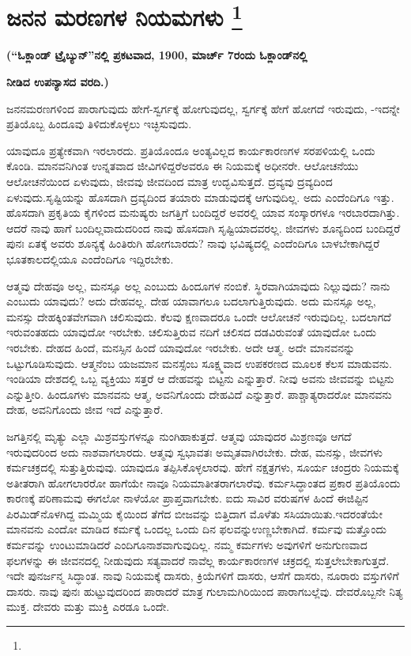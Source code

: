 
\chapter[ಜನನ ಮರಣಗಳ ನಿಯಮಗಳು ]{ಜನನ ಮರಣಗಳ ನಿಯಮಗಳು \protect\footnote{}}

\centerline{\textbf{(“ಓಕ್ಲಾಂಡ್​ ಟ್ರೈಬ್ಯುನ್​”ನಲ್ಲಿ ಪ್ರಕಟವಾದ, 1900, ಮಾರ್ಚ್​ 7ರಂದು ಓಕ್ಲಾಂಡ್​ನಲ್ಲಿ}}

\centerline{\textbf{ನೀಡಿದ ಉಪನ್ಯಾಸದ ವರದಿ.)}}

ಜನನಮರಣಗಳಿಂದ ಪಾರಾಗುವುದು ಹೇಗೆ-ಸ್ವರ್ಗಕ್ಕೆ ಹೋಗುವುದಲ್ಲ, ಸ್ವರ್ಗಕ್ಕೆ ಹೇಗೆ ಹೋಗದೆ ಇರುವುದು, -ಇದನ್ನೇ ಪ್ರತಿಯೊಬ್ಬ ಹಿಂದೂವು ತಿಳಿದುಕೊಳ್ಳಲು ಇಚ್ಛಿಸುವುದು.

ಯಾವುದೂ ಪ್ರತ್ಯೇಕವಾಗಿ ಇರಲಾರದು. ಪ್ರತಿಯೊಂದೂ ಅಂತ್ಯವಿಲ್ಲದ ಕಾರ್ಯಕಾರಣಗಳ ಸರಪಳಿಯಲ್ಲಿ ಒಂದು ಕೊಂಡಿ. ಮಾನವನಿಗಿಂತ ಉನ್ನತವಾದ ಜೀವಿಗಳಿದ್ದರೆ\break ಅವರೂ ಈ ನಿಯಮಕ್ಕೆ ಅಧೀನರೇ. ಆಲೋಚನೆಯು ಆಲೋಚನೆಯಿಂದ ಏಳುವುದು, ಜೀವವು ಜೀವದಿಂದ ಮಾತ್ರ ಉದ್ಭವಿಸುತ್ತದೆ. ದ್ರವ್ಯವು ದ್ರವ್ಯದಿಂದ ಏಳುವುದು.\break ಸೃಷ್ಟಿಯನ್ನು ಹೊಸದಾಗಿ ದ್ರವ್ಯದಿಂದ ತಯಾರು ಮಾಡುವುದಕ್ಕೆ ಆಗುವುದಿಲ್ಲ. ಅದು ಎಂದೆಂದಿಗೂ ಇತ್ತು. ಹೊಸದಾಗಿ ಪ್ರಕೃತಿಯ ಕೈಗಳಿಂದ ಮನುಷ್ಯರು ಜಗತ್ತಿಗೆ ಬಂದಿದ್ದರೆ ಅವರಲ್ಲಿ ಯಾವ ಸಂಸ್ಕಾರಗಳೂ ಇರಬಾರದಾಗಿತ್ತು. ಆದರೆ ನಾವು ಹಾಗೆ ಬಂದಿಲ್ಲವಾದುದರಿಂದ ನಾವು ಹೊಸದಾಗಿ ಸೃಷ್ಟಿಯಾದವರಲ್ಲ. ಜೀವಗಳು ಶೂನ್ಯದಿಂದ ಬಂದಿದ್ದರೆ ಪುನಃ ಏತಕ್ಕೆ ಅವರು ಶೂನ್ಯಕ್ಕೆ ಹಿಂತಿರುಗಿ ಹೋಗಬಾರದು? ನಾವು ಭವಿಷ್ಯದಲ್ಲಿ ಎಂದೆಂದಿಗೂ ಬಾಳಬೇಕಾಗಿದ್ದರೆ ಭೂತಕಾಲದಲ್ಲಿಯೂ ಎಂದೆಂದಿಗೂ ಇದ್ದಿರಬೇಕು.

ಆತ್ಮವು ದೇಹವೂ ಅಲ್ಲ, ಮನಸ್ಸೂ ಅಲ್ಲ ಎಂಬುದು ಹಿಂದೂಗಳ ನಂಬಿಕೆ. ಸ್ಥಿರವಾಗಿ\break ಯಾವುದು ನಿಲ್ಲುವುದು? ನಾನು ಎಂಬುದು ಯಾವುದು? ಅದು ದೇಹವಲ್ಲ. ದೇಹ ಯಾವಾಗಲೂ ಬದಲಾಗುತ್ತಿರುವುದು. ಅದು ಮನಸ್ಸೂ ಅಲ್ಲ, ಮನಸ್ಸು ದೇಹಕ್ಕಿಂತ\break ವೇಗವಾಗಿ ಚಲಿಸುವುದು. ಕೆಲವು ಕ್ಷಣವಾದರೂ ಒಂದೇ ಆಲೋಚನೆ ಇರುವುದಿಲ್ಲ. ಬದಲಾಗದೆ ಇರುವಂತಹದು ಯಾವುದೋ ಇರಬೇಕು. ಚಲಿಸುತ್ತಿರುವ ನದಿಗೆ ಚಲಿಸದ ದಡವಿರುವಂತೆ ಯಾವುದೋ ಒಂದು ಇರಬೇಕು. ದೇಹದ ಹಿಂದೆ, ಮನಸ್ಸಿನ ಹಿಂದೆ ಯಾವುದೋ ಇರಬೇಕು. ಅದೇ ಆತ್ಮ. ಅದೇ ಮಾನವನನ್ನು ಒಟ್ಟುಗೂಡಿಸುವುದು. ಆತ್ಮನೆಂಬ ಯಜಮಾನ ಮನಸ್ಸೆಂಬ ಸೂಕ್ಷ್ಮವಾದ ಉಪಕರಣದ ಮೂಲಕ ಕೆಲಸ ಮಾಡುವನು. ಇಂಡಿಯಾ ದೇಶದಲ್ಲಿ ಒಬ್ಬ ವ್ಯಕ್ತಿಯು ಸತ್ತರೆ ಆ ದೇಹವನ್ನು ಬಿಟ್ಟನು ಎನ್ನುತ್ತಾರೆ. ನೀವು ಅವನು ಜೀವವನ್ನು ಬಿಟ್ಟನು ಎನ್ನುತ್ತೀರಿ. ಹಿಂದೂಗಳು ಮಾನವನು ಆತ್ಮ, ಅವನಿಗೊಂದು ದೇಹವಿದೆ ಎನ್ನುತ್ತಾರೆ. ಪಾಶ್ಚಾತ್ಯರಾದರೋ ಮಾನವನು ದೇಹ, ಅವನಿಗೊಂದು ಜೀವ ಇದೆ ಎನ್ನುತ್ತಾರೆ.

ಜಗತ್ತಿನಲ್ಲಿ ಮೃತ್ಯು ಎಲ್ಲಾ ಮಿಶ್ರವಸ್ತುಗಳನ್ನೂ ನುಂಗಿಹಾಕುತ್ತದೆ. ಆತ್ಮವು ಯಾವುದರ ಮಿಶ್ರಣವೂ ಆಗದೆ ಇರುವುದರಿಂದ ಅದು ನಾಶವಾಗಲಾರದು. ಆತ್ಮವು ಸ್ವಭಾವತಃ ಅಮೃತವಾಗಿರಬೇಕು. ದೇಹ, ಮನಸ್ಸು, ಜೀವಗಳು ಕರ್ಮಚಕ್ರದಲ್ಲಿ ಸುತ್ತುತ್ತಿರುವುವು. ಯಾವುದೂ ತಪ್ಪಿಸಿಕೊಳ್ಳಲಾರವು. ಹೇಗೆ ನಕ್ಷತ್ರಗಳು, ಸೂರ್ಯ ಚಂದ್ರರು ನಿಯಮಕ್ಕೆ ಅತೀತರಾಗಿ ಹೋಗಲಾರರೋ ಹಾಗೆಯೇ ನಾವೂ ನಿಯಮಾತೀತರಾಗಲಾರೆವು. ಕರ್ಮಸಿದ್ಧಾಂತದ ಪ್ರಕಾರ ಪ್ರತಿಯೊಂದು ಕಾರಣಕ್ಕೆ ಪರಿಣಾಮವು ಈಗಲೋ ನಾಳೆಯೋ ಪ್ರಾಪ್ತವಾಗಬೇಕು. ಐದು ಸಾವಿರ ವರುಷಗಳ ಹಿಂದೆ ಈಜಿಪ್ಟಿನ ಪಿರಮಿಡ್​ನೊಳಗಿದ್ದ ಮಮ್ಮಿಯ ಕೈಯಿಂದ ತೆಗೆದ ಬೀಜವನ್ನು ಬಿತ್ತಿದಾಗ ಮೊಳೆತು ಸಸಿಯಾಯಿತು.\break ಇದರಂತೆಯೇ ಮಾನವನು ಎಂದೋ ಮಾಡಿದ ಕರ್ಮಕ್ಕೆ ಒಂದಲ್ಲ ಒಂದು ದಿನ ಫಲವನ್ನು\break ಉಣ್ಣಬೇಕಾಗಿದೆ. ಕರ್ಮವು ಮತ್ತೊಂದು ಕರ್ಮವನ್ನು ಉಂಟುಮಾಡಿದರೆ ಎಂದಿಗೂ\break ನಾಶವಾಗುವುದಿಲ್ಲ. ನಮ್ಮ ಕರ್ಮಗಳು ಅವುಗಳಿಗೆ ಅನುಗುಣವಾದ ಫಲಗಳನ್ನು ಈ ಜೀವನದಲ್ಲಿ ನೀಡುವುದು ಸತ್ಯವಾದರೆ ನಾವೆಲ್ಲ ಕಾರ್ಯಕಾರಣಗಳ ಚಕ್ರದಲ್ಲಿ ಸುತ್ತಲೇಬೇಕಾಗುತ್ತದೆ. ಇದೇ ಪುನರ್ಜನ್ಮ ಸಿದ್ಧಾಂತ. ನಾವು ನಿಯಮಕ್ಕೆ ದಾಸರು, ಕ್ರಿಯೆಗಳಿಗೆ ದಾಸರು, ಆಸೆಗೆ ದಾಸರು, ನೂರಾರು ವಸ್ತುಗಳಿಗೆ ದಾಸರು. ನಾವು ಪುನಃ ಹುಟ್ಟುವುದರಿಂದ ಪಾರಾದರೆ ಮಾತ್ರ ಗುಲಾಮಗಿರಿಯಿಂದ ಪಾರಾಗಬಲ್ಲೆವು. ದೇವರೊಬ್ಬನೇ ನಿತ್ಯ ಮುಕ್ತ. ದೇವರು ಮತ್ತು ಮುಕ್ತಿ ಎರಡೂ ಒಂದೇ.


